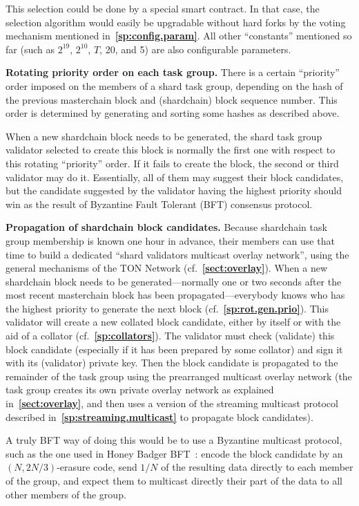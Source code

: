\documentclass[12pt,oneside]{article}
\def\makepoint#1{\medbreak\noindent{\bf #1.\ }}
\def\nxsubpoint{\refstepcounter{subsubsection}%
  \smallbreak\makepoint{\thesubsubsection}}
\def\refpoint#1{{\rm\textbf{\ref{#1}}}}
\let\ptref=\refpoint
\def\embt(#1.){\textbf{#1.}}
\begin{document}
This selection could be done by a special smart contract. In that
case, the selection algorithm would easily be upgradable without hard
forks by the voting mechanism mentioned
in~\ptref{sp:config.param}. All other ``constants'' mentioned so far
(such as $2^{19}$, $2^{10}$, $T$, 20, and 5) are also configurable
parameters.

\nxsubpoint\label{sp:rot.gen.prio} \embt(Rotating priority order on
each task group.)  There is a certain ``priority'' order imposed
on the members of a shard task group, depending on the hash of the
previous masterchain block and (shardchain) block sequence
number. This order is determined by generating and sorting some hashes
as described above.

When a new shardchain block needs to be generated, the shard task
group validator selected to create this block is normally the first
one with respect to this rotating ``priority'' order. If it fails to
create the block, the second or third validator may do
it. Essentially, all of them may suggest their block candidates, but
the candidate suggested by the validator having the highest priority
should win as the result of Byzantine Fault Tolerant (BFT) consensus
protocol.

\nxsubpoint\label{sp:sh.blk.cand.prop} \embt(Propagation of shardchain
block candidates.)  Because shardchain task group membership is
known one hour in advance, their members can use that time to build a
dedicated ``shard validators multicast overlay network'', using the
general mechanisms of the TON Network (cf.~\ptref{sect:overlay}). When
a new shardchain block needs to be generated---normally one or two
seconds after the most recent masterchain block has been
propagated---everybody knows who has the highest priority to generate
the next block (cf.~\ptref{sp:rot.gen.prio}). This validator will
create a new collated block candidate, either by itself or with the
aid of a collator (cf.~\ptref{sp:collators}). The validator must check
(validate) this block candidate (especially if it has been prepared by
some collator) and sign it with its (validator) private key. Then the
block candidate is propagated to the remainder of the task group
using the prearranged multicast overlay network (the task group
creates its own private overlay network as explained
in~\ptref{sect:overlay}, and then uses a version of the streaming
multicast protocol described in~\ptref{sp:streaming.multicast} to
propagate block candidates).

A truly BFT way of doing this would be to use a Byzantine multicast
protocol, such as the one used in Honey Badger BFT~\cite{HoneyBadger}:
encode the block candidate by an $(N,2N/3)$-erasure code, send $1/N$
of the resulting data directly to each member of the group, and expect
them to multicast directly their part of the data to all other members
of the group.
\end{document}
